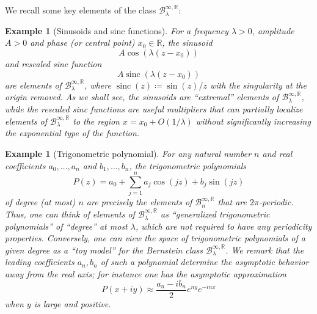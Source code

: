 \documentclass[12pt]{amsart}
\newtheorem{example}[theorem]{Example}
\newcommand{\R}{\mathbb{R}}
\newcommand{\sinc}{\operatorname{sinc}}
\begin{document}
We recall some key elements of the class ${\mathcal B}^{\infty,\R}_\lambda$:

\begin{example}[Sinusoids and sinc functions]\label{sinu-ex}  For a \emph{frequency} $\lambda > 0$, \emph{amplitude} $A > 0$ and \emph{phase} (or \emph{central point}) $x_0 \in \R$, the \emph{sinusoid}
\begin{equation}\label{acos}
    A \cos(\lambda (z - x_0))
\end{equation}
and \emph{rescaled sinc function}
\begin{equation}\label{asinc}
    A \sinc(\lambda (z - x_0))
\end{equation}
are elements of ${\mathcal B}^{\infty,\R}_\lambda$, where $\sinc(z) \coloneqq \sin(z)/z$ with the singularity at the origin removed.  As we shall see, the sinusoids are ``extremal'' elements of ${\mathcal B}^{\infty,\R}_\lambda$, while the rescaled sinc functions are useful multipliers that can partially localize elements of ${\mathcal B}^{\infty,\R}_\lambda$ to the region $x = x_0 + O(1/\lambda)$ without significantly increasing the exponential type of the function.
\end{example}

\begin{example}[Trigonometric polynomial]\label{poly-ex} For any natural number $n$ and real coefficients $a_0,\dots,a_n$ and $b_1,\dots,b_n$, the \emph{trigonometric polynomials}
\begin{equation}\label{trig}
 P(z) = a_0 + \sum_{j=1}^n a_j \cos(jz) + b_j \sin(jz)
\end{equation}
of degree (at most) $n$ are precisely the elements of ${\mathcal B}^{\infty,\R}_n$ that are $2\pi$-periodic. Thus, one can think of elements of ${\mathcal B}^{\infty,\R}_\lambda$ as ``generalized trigonometric polynomials'' of ``degree'' at most $\lambda$, which are not required to have any periodicity properties. Conversely, one can view the space of trigonometric polynomials of a given degree as a ``toy model'' for the Bernstein class ${\mathcal B}^{\infty,\R}_\lambda$.  We remark that the leading coefficients $a_n,b_n$ of such a polynomial determine the asymptotic behavior away from the real axis; for instance one has the asymptotic approximation
\begin{equation}\label{P-approx}
 P(x+iy) \approx \frac{a_n-ib_n}{2} e^{ny} e^{-inx}
\end{equation}
when $y$ is large and positive.
\end{example}
\end{document}
